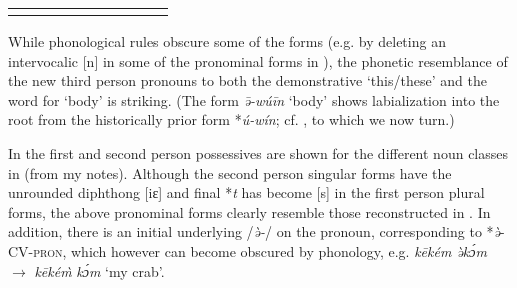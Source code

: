 \documentclass[output=paper]{langsci/langscibook}
\begin{document}
\begin{table}
\begin{tabularx}{\textwidth}{ll lllX llll}
\lspbottomrule
\end{tabularx}
\end{table}

While phonological rules obscure some of the forms (e.g. by deleting an intervocalic [n] in some of the pronominal forms in ), the phonetic resemblance of the new third person pronouns to both the demonstrative ‘this/these’ and the word for ‘body’ is striking. (The  form \textit{ə̄-wúīn} ‘body’ shows labialization into the root from the historically prior form *\textit{ú-wín}; cf. , to which we now turn.)

In  the first and second person possessives are shown for the different noun classes in  (from 
my notes). Although the second person singular forms have the unrounded diphthong [iɛ] and final *\textit{t} has become [s] in the 
first person plural forms, the above pronominal forms clearly resemble those reconstructed in  
. In addition, there is an initial underlying /\textit{ə̀-}/ on the pronoun, corresponding to  
*\textit{ə̀}-CV-\textsc{pron,} which however can become obscured by phonology, e.g. \textit{kēkém ə̀k}\textit{ɔ́m} 
\textit{${\rightarrow}$} \textit{kēké}\textit{\`{m}} \textit{kɔ́}\textit{m} ‘my crab’.
\end{document}
